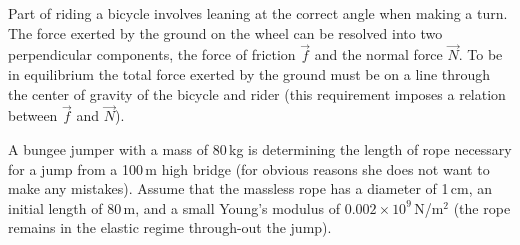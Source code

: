 \documentclass[letterpaper,addpoints,answers]{exam}
\begin{document}
\begin{questions}

\question
Part of riding a bicycle involves leaning at the correct angle when making a turn.  The force exerted by the ground on the wheel can be resolved into two perpendicular components, the force of friction $\vec{f}$ and the normal force $\vec{N}$.  To be in equilibrium the total force exerted by the ground must be on a line through the center of gravity of the bicycle and rider (this requirement imposes a relation between $\vec{f}$ and $\vec{N}$).



\pagebreak

\question
A bungee jumper with a mass of 80\,kg is determining the length of rope necessary for a jump from a 100\,m high bridge (for obvious reasons she does not want to make any mistakes). Assume that the massless rope has a diameter of 1\,cm, an initial length of 80\,m, and a small Young's modulus of $0.002 \times 10^{9}\,$N/m$^2$ (the rope remains in the elastic regime through-out the jump).
\begin{parts}

\end{parts}
\end{questions}
\end{document}
